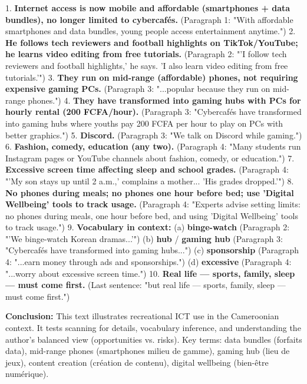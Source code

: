 \documentclass[11pt]{article}
\newcommand{\cle}[1]{{\popxbold\color{popdark}#1}}
\begin{document}
\begin{exoresolu}
1. \textbf{Internet access is now mobile and affordable (smartphones + data bundles), no longer limited to cybercafés.} (Paragraph 1: "With affordable smartphones and data bundles, young people access entertainment anytime.")
2. \textbf{He follows tech reviewers and football highlights on TikTok/YouTube; he learns video editing from free tutorials.} (Paragraph 2: "'I follow tech reviewers and football highlights,' he says. 'I also learn video editing from free tutorials.'")
3. \textbf{They run on mid-range (affordable) phones, not requiring expensive gaming PCs.} (Paragraph 3: "...popular because they run on mid-range phones.")
4. \textbf{They have transformed into gaming hubs with PCs for hourly rental (200 FCFA/hour).} (Paragraph 3: "Cybercafés have transformed into gaming hubs where youths pay 200 FCFA per hour to play on PCs with better graphics.")
5. \textbf{Discord.} (Paragraph 3: "We talk on Discord while gaming.")
6. \textbf{Fashion, comedy, education (any two).} (Paragraph 4: "Many students run Instagram pages or YouTube channels about fashion, comedy, or education.")
7. \textbf{Excessive screen time affecting sleep and school grades.} (Paragraph 4: "'My son stays up until 2 a.m.,' complains a mother... 'His grades dropped.'")
8. \textbf{No phones during meals; no phones one hour before bed; use 'Digital Wellbeing' tools to track usage.} (Paragraph 4: "Experts advise setting limits: no phones during meals, one hour before bed, and using 'Digital Wellbeing' tools to track usage.")
9. \textbf{Vocabulary in context:}
   (a) \textbf{binge-watch} (Paragraph 2: "'We binge-watch Korean dramas...'")
   (b) \textbf{hub} / \textbf{gaming hub} (Paragraph 3: "Cybercafés have transformed into gaming hubs...")
   (c) \textbf{sponsorship} (Paragraph 4: "...earn money through ads and sponsorships.")
   (d) \textbf{excessive} (Paragraph 4: "...worry about excessive screen time.")
10. \textbf{Real life — sports, family, sleep — must come first.} (Last sentence: "but real life — sports, family, sleep — must come first.")

\textbf{Conclusion:} This text illustrates recreational ICT use in the Cameroonian context. It tests scanning for details, vocabulary inference, and understanding the author's balanced view (opportunities vs. risks). Key terms: \cle{data bundles} (forfaits data), \cle{mid-range phones} (smartphones milieu de gamme), \cle{gaming hub} (lieu de jeux), \cle{content creation} (création de contenu), \cle{digital wellbeing} (bien-être numérique).
\end{exoresolu}
\end{document}
